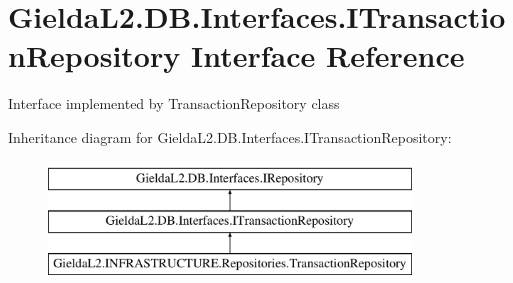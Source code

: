 \hypertarget{interface_gielda_l2_1_1_d_b_1_1_interfaces_1_1_i_transaction_repository}{}\section{Gielda\+L2.\+D\+B.\+Interfaces.\+I\+Transaction\+Repository Interface Reference}
\label{interface_gielda_l2_1_1_d_b_1_1_interfaces_1_1_i_transaction_repository}


Interface implemented by Transaction\+Repository class  


Inheritance diagram for Gielda\+L2.\+D\+B.\+Interfaces.\+I\+Transaction\+Repository\+:\begin{figure}[H]
\begin{center}
\leavevmode
\includegraphics[height=3.000000cm]{interface_gielda_l2_1_1_d_b_1_1_interfaces_1_1_i_transaction_repository}
\end{center}
\end{figure}
